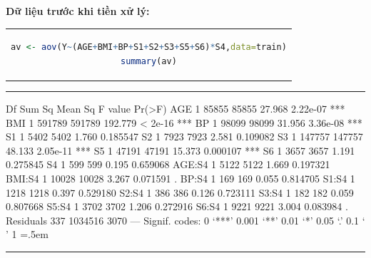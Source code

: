\documentclass[runningheads]{llncs}
\newenvironment{lcverbatim}
 {\SaveVerbatim{cverb}}
 {\endSaveVerbatim
  \flushleft\fboxrule=0pt\fboxsep=.5em
  \colorbox{cverbbg}{%
    \makebox[\dimexpr\linewidth-2\fboxsep][l]{\BUseVerbatim{cverb}}%
  }
  \endflushleft
}
\begin{document}
\textbf{Dữ liệu trước khi tiền xử lý:}
\begin{center}
\begin{tabular}{c}
\begin{lstlisting}[language=R]
av <- aov(Y~(AGE+BMI+BP+S1+S2+S3+S5+S6)*S4,data=train)
summary(av)
\end{lstlisting}
\end{tabular}
\end{center}
\hrule
\begin{lcverbatim}
             Df  Sum Sq Mean Sq F value   Pr(>F)    
AGE           1   85855   85855  27.968 2.22e-07 ***
BMI           1  591789  591789 192.779  < 2e-16 ***
BP            1   98099   98099  31.956 3.36e-08 ***
S1            1    5402    5402   1.760 0.185547    
S2            1    7923    7923   2.581 0.109082    
S3            1  147757  147757  48.133 2.05e-11 ***
S5            1   47191   47191  15.373 0.000107 ***
S6            1    3657    3657   1.191 0.275845    
S4            1     599     599   0.195 0.659068    
AGE:S4        1    5122    5122   1.669 0.197321    
BMI:S4        1   10028   10028   3.267 0.071591 .  
BP:S4         1     169     169   0.055 0.814705    
S1:S4         1    1218    1218   0.397 0.529180    
S2:S4         1     386     386   0.126 0.723111    
S3:S4         1     182     182   0.059 0.807668    
S5:S4         1    3702    3702   1.206 0.272916    
S6:S4         1    9221    9221   3.004 0.083984 .  
Residuals   337 1034516    3070                     
---
Signif. codes:  0 ‘***’ 0.001 ‘**’ 0.01 ‘*’ 0.05 ‘.’ 0.1 ‘ ’ 1
\end{lcverbatim}
\hrule
\vspace{0.5cm}
\end{document}
